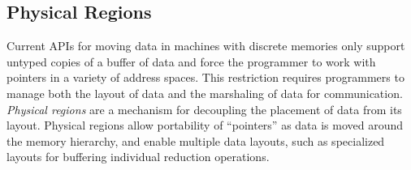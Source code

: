 \subsection{Physical Regions}
\label{subsec:phyreg}
Current APIs for moving data in machines with discrete memories only support untyped
copies of a buffer of data and force the programmer to work with pointers in a variety of address
spaces.  This restriction requires programmers to manage both the layout of
data and the marshaling of data for communication.  {\em Physical regions} are a
mechanism for decoupling the placement of data from its layout.  Physical regions allow portability
of ``pointers'' as data is moved around the memory hierarchy, and enable multiple data
layouts, such as specialized layouts for buffering individual reduction operations.




